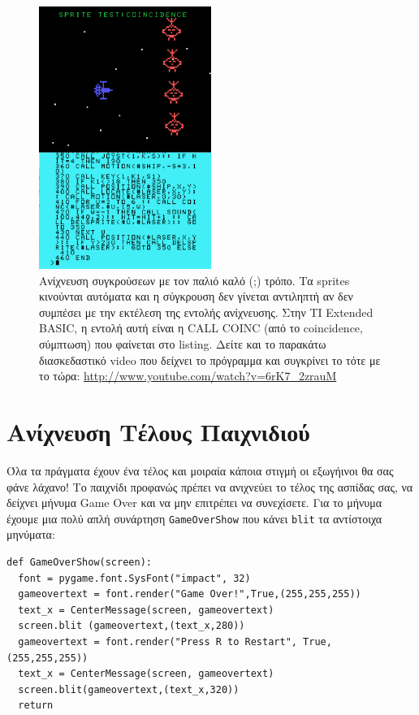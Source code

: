 \begin{figure}
\centering
\includegraphics[width=0.50\textwidth]{images/chapter9/coincidence3}
\caption[Ανίχνευση Συγκρούσεων, the old way!]{Ανίχνευση συγκρούσεων με τον παλιό καλό (;) τρόπο. Τα sprites κινούνται αυτόματα και η σύγκρουση δεν γίνεται αντιληπτή αν δεν συμπέσει με την  εκτέλεση της εντολής ανίχνευσης. Στην TI Extended BASIC, η εντολή αυτή είναι η CALL COINC (από το coincidence, σύμπτωση) που φαίνεται στο listing.  Δείτε και το παρακάτω διασκεδαστικό video που δείχνει το πρόγραμμα και συγκρίνει το τότε με το τώρα: \url{http://www.youtube.com/watch?v=6rK7_2zrauM}}
\label{9-6}
\end{figure}
%
\section{Ανίχνευση Τέλους Παιχνιδιού}
%
Όλα τα πράγματα έχουν ένα τέλος και μοιραία κάποια στιγμή οι εξωγήινοι θα σας φάνε λάχανο! Το παιχνίδι προφανώς πρέπει να ανιχνεύει το τέλος της ασπίδας σας, να δείχνει μήνυμα Game Over και να μην επιτρέπει να συνεχίσετε. Για το μήνυμα έχουμε μια πολύ απλή συνάρτηση {\tt GameOverShow} που κάνει {\tt blit} τα αντίστοιχα μηνύματα:

\begin{verbatim}
def GameOverShow(screen):
  font = pygame.font.SysFont("impact", 32)
  gameovertext = font.render("Game Over!",True,(255,255,255))
  text_x = CenterMessage(screen, gameovertext)
  screen.blit (gameovertext,(text_x,280))
  gameovertext = font.render("Press R to Restart", True, (255,255,255))
  text_x = CenterMessage(screen, gameovertext)
  screen.blit(gameovertext,(text_x,320))
  return
\end{verbatim}

